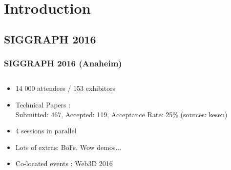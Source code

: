 \section{Introduction}
\subsection{SIGGRAPH 2016}
\frame
{
	\frametitle{SIGGRAPH 2016 (Anaheim)}
	\begin{minipage}[0.2\textheight]{\textwidth}
  				\begin{columns}[T]
  					\begin{column}{0.6\textwidth}
    			\begin{itemize}
    				\item 14 000 attendees / 153 exhibitors 
    				\item Technical Papers :\\ Submitted: 467, Accepted: 119, Acceptance Rate: 25\% (sources: kesen)
    				\item 4 sessions in parallel
    				\item Lots of extras: BoFs, Wow demos...
    				\item Co-located events : Web3D 2016 
    			\end{itemize}
    			

\end{column}
\end{columns}
\end{minipage}}
